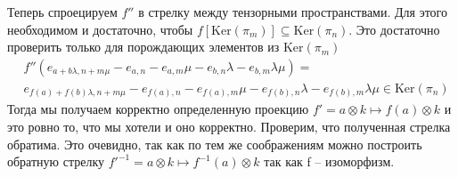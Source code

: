 \documentclass{article}
\begin{document}
\begin{enumerate}
\begin{enumerate}
                Теперь спроецируем $f''$ в стрелку между тензорными пространствами. Для этого необходимом и достаточно, 
                чтобы $f[\text{Ker}(\pi_m)]\subseteq\text{Ker}(\pi_n)$. Это достаточно проверить только для порождающих
                элементов из $\text{Ker}(\pi_m)$
                \begin{align*}
                    &f''(e_{a+b\lambda,n+m\mu}-e_{a,n}-e_{a,m}\mu-e_{b,n}\lambda-e_{b,m}\lambda\mu)=\\
                    &e_{f(a)+f(b)\lambda,n+m\mu}-e_{f(a),n}-e_{f(a),m}\mu-e_{f(b),n}\lambda-e_{f(b),m}\lambda\mu\in
                    \text{Ker}(\pi_n)
                \end{align*}
                Тогда мы получаем корректно определенную проекцию $f'=a\otimes k\mapsto f(a)\otimes k$ и это ровно то,
                что мы хотели и оно корректно. Проверим, что полученная стрелка обратима. Это очевидно, так как по тем
                же соображениям можно построить обратную стрелку $f'^{-1}=a\otimes k\mapsto f^{-1}(a)\otimes k$ так
                как f – изоморфизм.

        \end{enumerate}

\end{enumerate}
\end{document}
